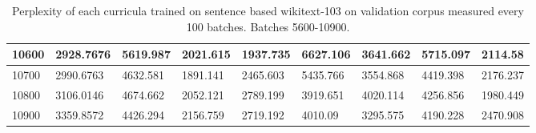 \documentclass [11pt, proquest] {uwthesis}[2020/12/20]
\begin{document}
\begin{table}[]
\begin{tiny}
\begin{tabular}{|l|l|l|l|l|l|l|l|l|}
10600 & 2928.7676 & 5619.987 & 2021.615 & 1937.735 & 6627.106 & 3641.662 & 5715.097 & 2114.58 \\ \hline
10700 & 2990.6763 & 4632.581 & 1891.141 & 2465.603 & 5435.766 & 3554.868 & 4419.398 & 2176.237 \\ \hline
10800 & 3106.0146 & 4674.662 & 2052.121 & 2789.199 & 3919.651 & 4020.114 & 4256.856 & 1980.449 \\ \hline
10900 & 3359.8572 & 4426.294 & 2156.759 & 2719.192 & 4010.09 & 3295.575 & 4190.228 & 2470.908 \\ \hline
\end{tabular}
\end{tiny}
\caption{Perplexity of each curricula trained on sentence based wikitext-103 on validation corpus measured every 100 batches. Batches 5600-10900.}
\label{tab:wikitext-103-sentence-2}
\end{table}
\end{document}
